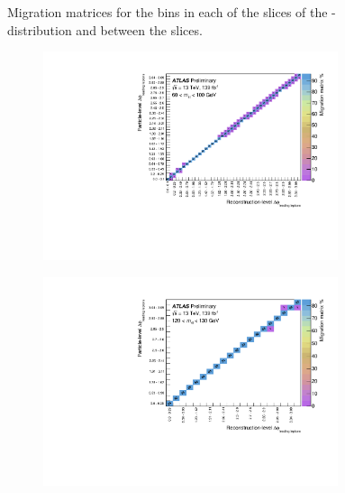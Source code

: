 \begin{figure}[htb]
\caption{Migration matrices for the \dYPairs bins in each of the \mFourL slices of the \dYPairs-\mFourL distribution and between the slices.}
 \end{figure}



\begin{figure}[htb]
  \centering
  \begin{subfigure}{.49\textwidth}\centering\includegraphics[width = 0.95\textwidth]{Figures/m4l/UnfoldingStudies/v014_matrices/deltaPhiLeadingLeptons_m4l60-100Matrix.pdf}\end{subfigure}
  \begin{subfigure}{.49\textwidth}\centering\includegraphics[width = 0.95\textwidth]{Figures/m4l/UnfoldingStudies/v014_matrices/deltaPhiLeadingLeptons_m4l120-130Matrix.pdf}\end{subfigure}

\end{figure}
